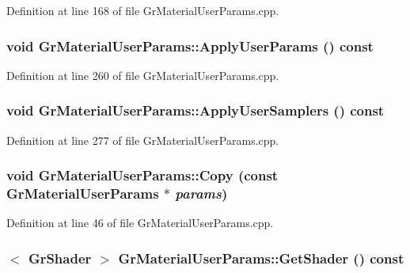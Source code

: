 Definition at line 168 of file GrMaterialUserParams.cpp.\hypertarget{class_gr_material_user_params_8b3930f139352c856d7ed694a3c05de6}{
\subsubsection[{ApplyUserParams}]{\setlength{\rightskip}{0pt plus 5cm}void GrMaterialUserParams::ApplyUserParams () const}}
\label{class_gr_material_user_params_8b3930f139352c856d7ed694a3c05de6}




Definition at line 260 of file GrMaterialUserParams.cpp.\hypertarget{class_gr_material_user_params_6aabd7e3eda8be6d4b764d8f4a4a2ce2}{
\subsubsection[{ApplyUserSamplers}]{\setlength{\rightskip}{0pt plus 5cm}void GrMaterialUserParams::ApplyUserSamplers () const}}
\label{class_gr_material_user_params_6aabd7e3eda8be6d4b764d8f4a4a2ce2}




Definition at line 277 of file GrMaterialUserParams.cpp.\hypertarget{class_gr_material_user_params_68f66bcafa7224fbb4e613f5140b2ae5}{
\subsubsection[{Copy}]{\setlength{\rightskip}{0pt plus 5cm}void GrMaterialUserParams::Copy (const {\bf GrMaterialUserParams} $\ast$ {\em params})}}
\label{class_gr_material_user_params_68f66bcafa7224fbb4e613f5140b2ae5}




Definition at line 46 of file GrMaterialUserParams.cpp.\hypertarget{class_gr_material_user_params_7a1979f2346b1d3c4d2575c129c85650}{
\subsubsection[{GetShader}]{$<$ {\bf GrShader} $>$ GrMaterialUserParams::GetShader () const}}
\label{class_gr_material_user_params_7a1979f2346b1d3c4d2575c129c85650}




